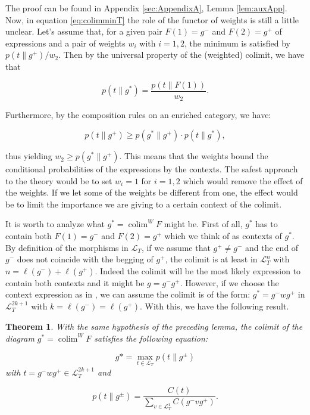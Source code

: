 \documentclass[10pt,a4paper]{elsarticle}
\renewcommand{\L}{\mathcal{L}}
\newcommand{\colim}{\operatorname{colim}}
\newtheorem{theorem}{Theorem}[section]
\begin{document}
The proof can be found in Appendix \ref{sec:AppendixA}, Lemma \ref{lem:auxApp}. Now, in equation \eqref{eq:colimminT} the role of the functor of weights is still a little unclear. Let's assume that, for a given pair $F(1)=g^{-}$ and $F(2)=g^{+}$ of expressions and a pair of weights $w_{i}$ with $i=1,2$, the minimum is satisfied by $p(t\|g^{+})/w_2$. Then by the universal property of the (weighted) colimit, we have that

\begin{equation*}
	p(t\|g^{*})=\frac{p(t\|F(1))}{w_2}.
\end{equation*}

Furthermore, by the composition rules on an enriched category, we have:

\begin{equation*}
	p(t\|g^{+})\geq p(g^{*}\|g^{+})\cdot p(t\|g^{*}),
\end{equation*}

thus yielding $w_2\geq p(g^{*}\|g^{+})$. This means that the weights bound the conditional probabilities of the expressions by the contexts. The safest approach to the theory would be to set $w_i=1$ for $i=1,2$ which would remove the effect of the weights. If we let some of the weights be different from one, the effect would be to limit the importance we are giving to a certain context of the colimit.

It is worth to analyze what $g^{*}=\colim^{W}F$ might be. First of all, $g^{*}$ has to contain both $F(1)=g^{-}$ and $F(2)=g^{+}$ which we think of as contexts of $g^{*}$. By definition of the morphisms in $\L_{T}$, if we assume that $g^{+}\neq g^{-}$ and the end of $g^{-}$ does not coincide with the begging of $g^{+}$, the colimit is at least in $\L_{T}^{n}$ with $n = \ell(g^{-})+\ell(g^{+})$. Indeed the colimit will be the most likely expression to contain both contexts and it might be $g=g^{-}g^{+}$. However, if we choose the context expression as in \cite{Mikolov2013EfficientEO}, we can assume the colimit is of the form: $g^{*}=g^{-} w g^{+}$ in $\L_{T}^{2k+1}$ with $k=\ell(g^{-}) = \ell(g^{+})$. With this, we have the following result.


\begin{theorem}\label{thm:colimmaxprob}
	With the same hypothesis of the preceding lemma, the colimit of the diagram $g^{*}=\colim ^{W}F$ satisfies the following equation:
	
	\begin{equation}\label{eq:colimmaxprobT}
		g*= \max_{t\in \L_{T}}p(t\| g^{\pm})
	\end{equation}
	with $t=g^{-}wg^{+}\in \L_{T}^{2k+1}$ and
	
	\begin{equation}\label{eq:probW2V}
		p(t\| g^{\pm})=\frac{C(t)}{\sum_{v\in\L_{T}^{1}}C(g^{-}vg^{+})}.
	\end{equation}
\end{theorem}
\end{document}
